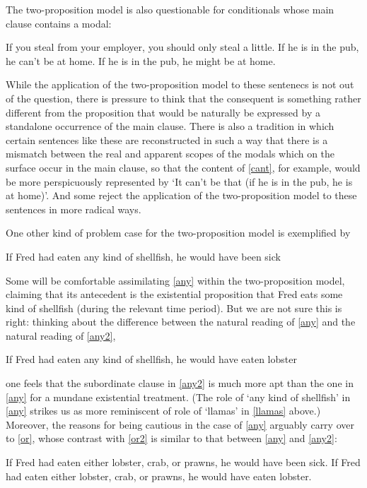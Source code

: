 \documentclass[If.tex]{subfiles}
\begin{document}
The two-proposition model is also questionable for conditionals whose main clause contains a modal:
\begin{prop}
\nitem
	\begin{prop}
		\aitem 
		If you steal from your employer, you should only steal a little.
		\aitem \label{cant} 
		If he is in the pub, he can't be at home.
		\aitem 
		If he is in the pub, he might be at home.
	\end{prop}
\end{prop}
While the application of the two-proposition model to these sentenecs is not out of the question, there is pressure to think that the consequent is something rather different from the proposition that would be naturally be expressed by a standalone occurrence of the main clause. There is also a tradition in which certain sentences like these are reconstructed in such a way that there is a mismatch between the real and apparent scopes of the modals which on the surface occur in the main clause, so that the content of \ref{cant}, for example, would be more perspicuously represented by ‘It can't be that (if he is in the pub, he is at home)’. And some \citep[e.g.][]{KratzerConditionals} reject the application of the two-proposition model to these sentences in more radical ways.%

One other kind of problem case for the two-proposition model is exemplified by
\begin{prop}
	\nitem \label{any} 
	If Fred had eaten any kind of shellfish, he would have been sick
\end{prop}
Some will be comfortable assimilating \ref{any} within the two-proposition model, claiming that its antecedent is the existential proposition that Fred eats some kind of shellfish (during the relevant time period). But we are not sure this is right: thinking about the difference between the natural reading of \ref{any} and the natural reading of \ref{any2},
\begin{prop}
	\nitem \label{any2} 
	If Fred had eaten any kind of shellfish, he would have eaten lobster
\end{prop}
one feels that the subordinate clause in \ref{any2} is much more apt than the one in \ref{any} for a mundane existential treatment.  (The role of ‘any kind of shellfish’ in \ref{any} strikes us as more reminiscent of role of ‘llamas’ in \ref{llamas} above.) Moreover, the reasons for being cautious in the case of \ref{any} arguably carry over to \ref{or}, whose contrast with \ref{or2} is similar to that between \ref{any} and \ref{any2}:
\begin{prop}
	\nitem \label{or} 
	If Fred had eaten either lobster, crab, or prawns, he would have been sick.
	\nitem \label{or2} 
	If Fred had eaten either lobster, crab, or prawns, he would have eaten lobster.
\end{prop}
\end{document}
